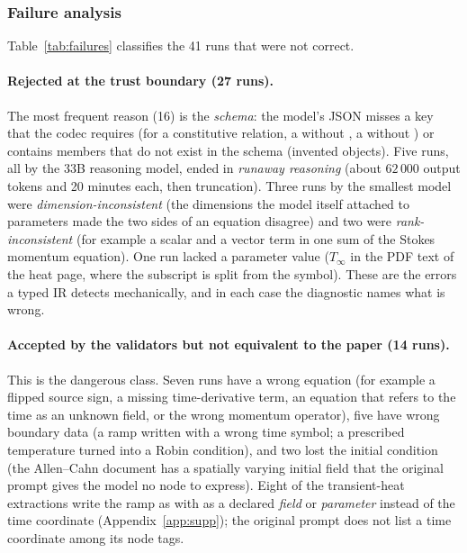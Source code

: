 \subsubsection{Failure analysis}
Table~\ref{tab:failures} classifies the 41 runs that were not correct.
\begin{table}[t]
\centering\small
\caption{What happened in the 41 runs (original prompt) that were not correct.}
\label{tab:failures}

\end{table}

\paragraph{Rejected at the trust boundary (27 runs).} The most frequent reason (16) is the \emph{schema}: the model's JSON misses a key that the codec requires (for a constitutive relation, a  without , a  without ) or contains members that do not exist in the schema (invented  objects). Five runs, all by the 33B reasoning model, ended in \emph{runaway reasoning} (about $62\,000$ output tokens and 20 minutes each, then truncation). Three runs by the smallest model were \emph{dimension-inconsistent} (the dimensions the model itself attached to parameters made the two sides of an equation disagree) and two were \emph{rank-inconsistent} (for example a scalar and a vector term in one sum of the Stokes momentum equation). One run lacked a parameter value ($T_\infty$ in the PDF text of the heat page, where the subscript is split from the symbol). These are the errors a typed IR detects mechanically, and in each case the diagnostic names what is wrong.

\paragraph{Accepted by the validators but not equivalent to the paper (14 runs).} This is the dangerous class. Seven runs have a wrong equation (for example a flipped source sign, a missing time-derivative term, an equation that refers to the time as an unknown field, or the wrong momentum operator), five have wrong boundary data (a ramp written with a wrong time symbol; a prescribed temperature turned into a Robin condition), and two lost the initial condition (the Allen--Cahn document has a spatially varying initial field that the original prompt gives the model no node to express). Eight of the transient-heat extractions write the ramp as  with  as a declared \emph{field} or \emph{parameter} instead of the time coordinate (Appendix~\ref{app:supp}); the original prompt does not list a time coordinate among its node tags.

